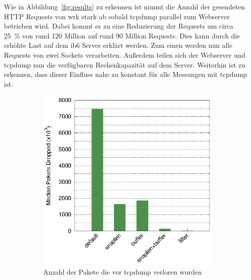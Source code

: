 Wie in Abbildung~\ref{fig:results} zu erkennen ist nimmt die Anzahl der
gesendeten HTTP Requests von wrk stark ab sobald tcpdump parallel zum Webserver
betrieben wird. Dabei kommt es zu eine Reduzierung der Requests um circa 25~\%
von rund 120 Million auf rund 90 Million Requests. Dies kann durch die erhöhte
Last auf dem ib6 Server erklärt werden. Zum einen werden nun alle Requests von
zwei Sockets verarbeiten. Außerdem teilen sich der Webserver und tcpdump nun
die verfügbaren Rechenkapazität auf dem Server. Weiterhin ist zu erkennen,
dass dieser Einfluss nahe zu konstant für alle Messungen mit tcpdump ist.

\begin{figure}
  \begin{subfigure}[b]{0.5\textwidth}
    \includegraphics[width=\textwidth]{images/dropped}
    \caption{Anzahl der Pakete die vor tcpdump verloren wurden}\label{fig:dropped}
  \end{subfigure}
  \begin{subfigure}[b]{0.5\textwidth}

\end{subfigure}
\end{figure}
